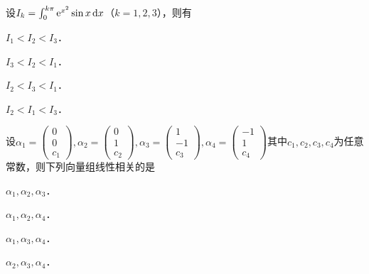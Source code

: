 \documentclass[plain,noanswer,medmath]{../../template/jnuexam}
\begin{document}
\begin{problem}
设$I_k = \int_0^{k\pi} \mathrm{e}^{x^{2}} \sin x\mathop{}\!\mathrm{d} x$（$k = 1,2,3$），则有\pickout{}
\begin{abcd}
\item $I_1 < I_2 < I_3$．
\item $I_3 < I_2 < I_1$．
\item $I_2 < I_3 < I_1$．
\item $I_2 < I_1 < I_3$．
\end{abcd}
\end{problem}


\begin{problem}
设$\alpha_1 = \begin{pmatrix}
  0 \\
  0 \\
  c_1
\end{pmatrix},\alpha_2 = \begin{pmatrix}
  0 \\
  1 \\
  c_2
\end{pmatrix},\alpha_3 = \begin{pmatrix}
  1 \\
  -1 \\
  c_3
\end{pmatrix},\alpha_4 = \begin{pmatrix}
  -1 \\
  1 \\
  c_4
\end{pmatrix}$其中$c_1,c_2,c_3,c_4$为任意常数，则下列向量组线性相关的是\pickout{}
\begin{abcd}
\item $\alpha_1,\alpha_2,\alpha_3$．
\item $\alpha_1,\alpha_2,\alpha_4$．
\item $\alpha_1,\alpha_3,\alpha_4$．
\item $\alpha_2,\alpha_3,\alpha_4$．
\end{abcd}
\end{problem}
\end{document}
